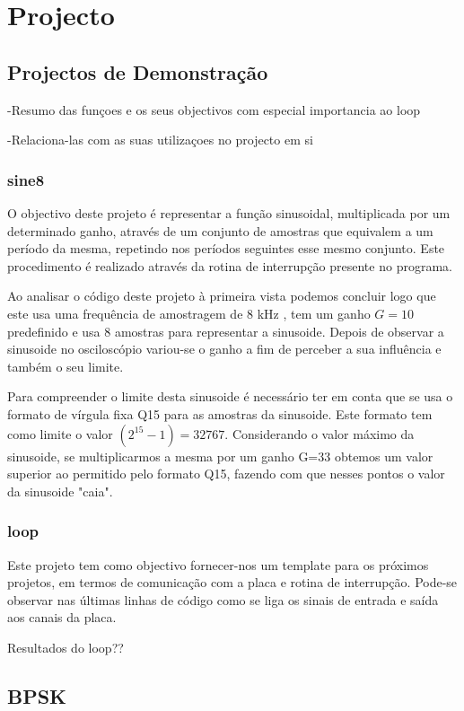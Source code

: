 \documentclass[11pt]{article}
\begin{document}
\section{Projecto}

\subsection{Projectos de Demonstração}
-Resumo das funçoes e os seus objectivos com especial importancia ao loop

-Relaciona-las com as suas utilizaçoes no projecto em si

\subsubsection{sine8}
O objectivo deste projeto é representar a função sinusoidal, multiplicada por um determinado ganho, através de um conjunto de amostras que equivalem a um período da mesma, repetindo nos períodos seguintes esse mesmo conjunto. Este procedimento é realizado através da rotina de interrupção presente no programa. 

Ao analisar o código deste projeto à primeira vista podemos concluir logo que este usa uma frequência de amostragem de 8 kHz , tem um ganho $G=10$ predefinido e usa 8 amostras para representar a sinusoide. Depois de observar a sinusoide no osciloscópio variou-se o ganho a fim de perceber a sua influência e também o seu limite.
 
Para compreender o limite desta sinusoide é necessário ter em conta que se usa o formato de vírgula fixa Q15 para as amostras da sinusoide. Este formato tem como limite o valor $(2^{15}-1) = 32767$. Considerando o valor máximo da sinusoide, se multiplicarmos a mesma por um ganho G=33 obtemos um valor superior ao permitido pelo formato Q15, fazendo com que nesses pontos o valor da sinusoide "caia".     

\subsubsection{loop}
Este projeto tem como objectivo fornecer-nos um template para os próximos projetos, em termos de comunicação com a placa e rotina de interrupção. Pode-se observar nas últimas linhas de código como se liga os sinais de entrada e saída aos canais da placa.

Resultados do loop??

\subsection{BPSK}
\end{document}
